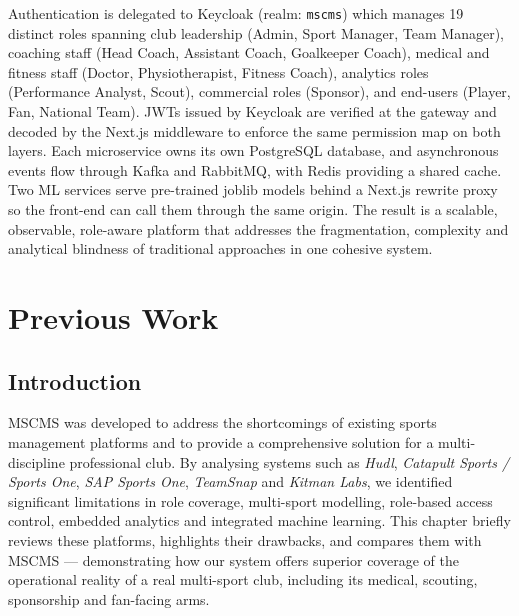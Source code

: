 \documentclass[12pt,a4paper,oneside]{report}
\begin{document}
Authentication is delegated to Keycloak (realm: \texttt{mscms}) which
manages 19 distinct roles spanning club leadership (Admin, Sport
Manager, Team Manager), coaching staff (Head Coach, Assistant Coach,
Goalkeeper Coach), medical and fitness staff (Doctor, Physiotherapist,
Fitness Coach), analytics roles (Performance Analyst, Scout),
commercial roles (Sponsor), and end-users (Player, Fan, National Team).
JWTs issued by Keycloak are verified at the gateway and decoded by the
Next.js middleware to enforce the same permission map on both layers.
Each microservice owns its own PostgreSQL database, and asynchronous
events flow through Kafka and RabbitMQ, with Redis providing a shared
cache. Two ML services serve pre-trained joblib models behind a
Next.js rewrite proxy so the front-end can call them through the same
origin. The result is a scalable, observable, role-aware platform that
addresses the fragmentation, complexity and analytical blindness of
traditional approaches in one cohesive system.


\iffalse
\chapter{Previous Work}
\label{ch:prevwork}

\section{Introduction}
MSCMS was developed to address the shortcomings of existing sports
management platforms and to provide a comprehensive solution for a
multi-discipline professional club. By analysing systems such as
\emph{Hudl}, \emph{Catapult Sports / Sports One}, \emph{SAP Sports One},
\emph{TeamSnap} and \emph{Kitman Labs}, we identified significant
limitations in role coverage, multi-sport modelling, role-based access
control, embedded analytics and integrated machine learning. This
chapter briefly reviews these platforms, highlights their drawbacks,
and compares them with MSCMS --- demonstrating how our system offers
superior coverage of the operational reality of a real multi-sport
club, including its medical, scouting, sponsorship and fan-facing
arms.
\end{document}
